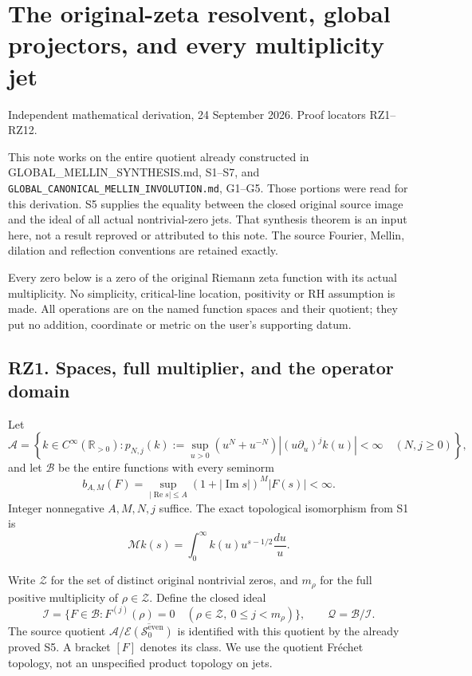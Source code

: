 \documentclass[
]{article}
\begin{document}
\section{The original-zeta resolvent, global projectors, and every
multiplicity
jet}\label{the-original-zeta-resolvent-global-projectors-and-every-multiplicity-jet}

Independent mathematical derivation, 24 September 2026. Proof locators
RZ1--RZ12.

This note works on the entire quotient already constructed in
GLOBAL\_MELLIN\_SYNTHESIS.md, S1--S7, and
\nolinkurl{GLOBAL_CANONICAL_MELLIN_INVOLUTION.md}, G1--G5. Those portions were
read for this derivation. S5 supplies the equality between the closed
original source image and the ideal of all actual nontrivial-zero jets.
That synthesis theorem is an input here, not a result reproved or
attributed to this note. The source Fourier, Mellin, dilation and
reflection conventions are retained exactly.

Every zero below is a zero of the original Riemann zeta function with
its actual multiplicity. No simplicity, critical-line location,
positivity or RH assumption is made. All operations are on the named
function spaces and their quotient; they put no addition, coordinate or
metric on the user's supporting datum.

\subsection{RZ1. Spaces, full multiplier, and the operator
domain}\label{rz1.-spaces-full-multiplier-and-the-operator-domain}

Let \[
\mathcal A=\left\{k\in C^\infty(\mathbb R_{>0}):
p_{N,j}(k):=\sup_{u>0}(u^N+u^{-N})
|(u\partial_u)^jk(u)|<\infty\quad(N,j\geq0)\right\},
\tag{RZ1.1}
\] and let \(\mathcal B\) be the entire functions with every seminorm \[
b_{A,M}(F)=
\sup_{|\operatorname{Re}s|\leq A}
(1+|\operatorname{Im}s|)^M|F(s)|<\infty.
\tag{RZ1.2}
\] Integer nonnegative \(A,M,N,j\) suffice. The exact topological
isomorphism from S1 is \[
\mathcal Mk(s)=\int_0^\infty k(u)u^{s-1/2}\frac{du}{u}.
\tag{RZ1.3}
\]

Write \(\mathscr Z\) for the set of distinct original nontrivial zeros,
and \(m_\rho\) for the full positive multiplicity of
\(\rho\in\mathscr Z\). Define the closed ideal \[
\mathcal I=\{F\in\mathcal B:
F^{(j)}(\rho)=0\quad
(\rho\in\mathscr Z,\ 0\leq j<m_\rho)\},
\qquad \mathcal Q=\mathcal B/\mathcal I.
\tag{RZ1.4}
\] The source quotient
\(\mathcal A/\overline{\mathcal E(\mathcal S_0^{\mathrm{even}})}\) is
identified with this quotient by the already proved S5. A bracket
\([F]\) denotes its class. We use the quotient Fréchet topology, not an
unspecified product topology on jets.
\end{document}
